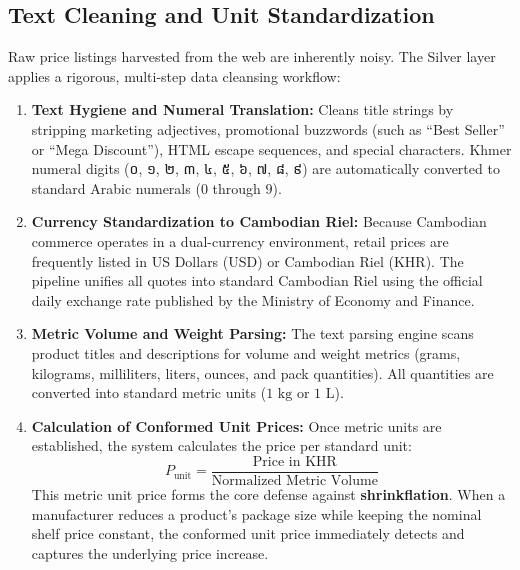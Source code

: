 \subsection{Text Cleaning and Unit Standardization}
\hs Raw price listings harvested from the web are inherently noisy. The Silver layer applies a rigorous, multi-step data cleansing workflow:
\begin{enumerate}
    \item \textbf{Text Hygiene and Numeral Translation:} Cleans title strings by stripping marketing adjectives, promotional buzzwords (such as ``Best Seller'' or ``Mega Discount''), HTML escape sequences, and special characters. Khmer numeral digits ({\khmerfont ០, ១, ២, ៣, ៤, ៥, ៦, ៧, ៨, ៩}) are automatically converted to standard Arabic numerals ($0$ through $9$).
    \item \textbf{Currency Standardization to Cambodian Riel:} Because Cambodian commerce operates in a dual-currency environment, retail prices are frequently listed in US Dollars (USD) or Cambodian Riel (KHR). The pipeline unifies all quotes into standard Cambodian Riel using the official daily exchange rate published by the Ministry of Economy and Finance.
    \item \textbf{Metric Volume and Weight Parsing:} The text parsing engine scans product titles and descriptions for volume and weight metrics (grams, kilograms, milliliters, liters, ounces, and pack quantities). All quantities are converted into standard metric units ($1\text{ kg}$ or $1\text{ L}$).
    \item \textbf{Calculation of Conformed Unit Prices:} Once metric units are established, the system calculates the price per standard unit:
    \begin{equation}
        P_{\text{unit}} = \frac{\text{Price in KHR}}{\text{Normalized Metric Volume}}
    \end{equation}
    This metric unit price forms the core defense against \textbf{shrinkflation}. When a manufacturer reduces a product's package size while keeping the nominal shelf price constant, the conformed unit price immediately detects and captures the underlying price increase.
\end{enumerate}

